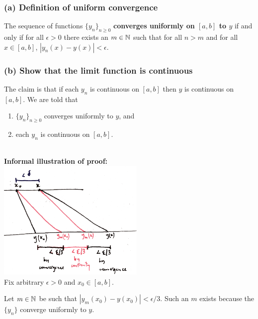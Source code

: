 \documentclass[12pt]{article}
\begin{document}
\begin{mdframed}
  \subsubsection*{(a) Definition of uniform convergence}
  The sequence of functions $\{y_n\}_{n\geq 0}$ \textbf{converges uniformly on
    $[a, b]$ to $y$} if and only if for all $\epsilon > 0$ there exists an
  $m \in \mathbb{N}$ such that for all $n > m$ and for all $x \in [a,b]$,
  $|y_n(x) - y(x)| < \epsilon$.

  \subsubsection*{(b) Show that the limit function is continuous}

  The claim is that if each $y_n$ is continuous on $[a,b]$ then $y$ is
  continuous on $[a,b]$. We are told that
  \begin{enumerate}
  \item $\{y_n\}_{n \geq 0}$ converges uniformly to $y$, and
  \item each $y_n$ is continuous on $[a,b]$.
  \end{enumerate}
  ~\\
  \textbf{Informal illustration of proof:}\\
  \includegraphics[width=200pt]{img/differential-equations-a1-1-1-a-diagram.png}\\


  Fix arbitrary $\epsilon > 0$ and $x_0 \in [a,b]$.

  Let $m \in \mathbb{N}$ be such that $|y_m(x_0) - y(x_0)| < \epsilon/3$. Such an $m$
  exists because the $\{y_n\}$ converge uniformly to $y$.


\end{mdframed}
\end{document}
